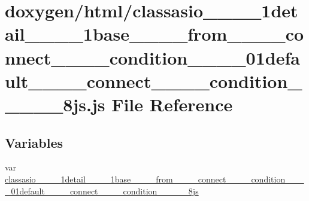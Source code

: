 \hypertarget{classasio____1____1detail____1____1base________from________connect________condition____3____01de7f706a6f5d532612a9f089ab862a4d05}{}\section{doxygen/html/classasio\+\_\+\+\_\+\_\+\+\_\+1detail\+\_\+\+\_\+\_\+\+\_\+1base\+\_\+\+\_\+\+\_\+\+\_\+from\+\_\+\+\_\+\+\_\+\+\_\+connect\+\_\+\+\_\+\+\_\+\+\_\+condition\+\_\+\+\_\+\_\+\+\_\+01default\+\_\+\+\_\+\+\_\+\+\_\+connect\+\_\+\+\_\+\+\_\+\+\_\+condition\+\_\+\+\_\+\_\+\+\_\+\_\+8js.js File Reference}
\label{classasio____1____1detail____1____1base________from________connect________condition____3____01de7f706a6f5d532612a9f089ab862a4d05}
\subsection*{Variables}
\begin{DoxyCompactItemize}
\item 
var \hyperlink{classasio____1____1detail____1____1base________from________connect________condition____3____01de7f706a6f5d532612a9f089ab862a4d05_a18222bf4ca9f3e100d11c0ac11ffd9c1}{classasio\+\_\+\+\_\+\_\+\+\_\+1detail\+\_\+\+\_\+\_\+\+\_\+1base\+\_\+\+\_\+\+\_\+\+\_\+from\+\_\+\+\_\+\+\_\+\+\_\+connect\+\_\+\+\_\+\+\_\+\+\_\+condition\+\_\+\+\_\+\_\+\+\_\+01default\+\_\+\+\_\+\+\_\+\+\_\+connect\+\_\+\+\_\+\+\_\+\+\_\+condition\+\_\+\+\_\+\_\+\+\_\+\_\+8js}
\end{DoxyCompactItemize}


